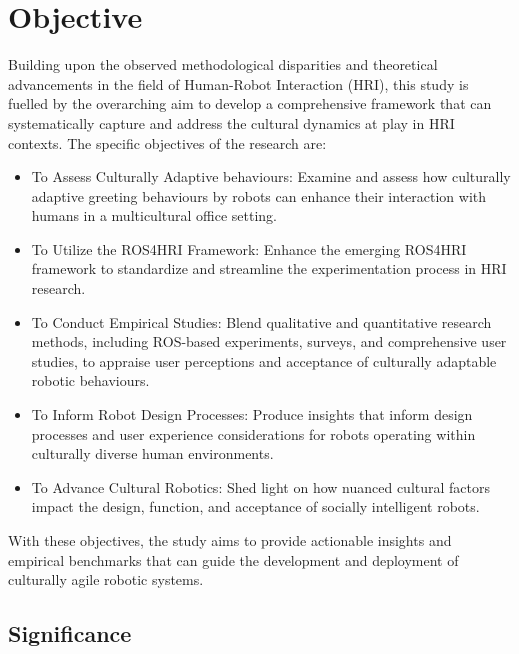 
\chapter{Objective}

Building upon the observed methodological disparities and theoretical advancements in the field of Human-Robot Interaction (HRI), this study is fuelled by the overarching aim to develop a comprehensive framework that can systematically capture and address the cultural dynamics at play in HRI contexts. The specific objectives of the research are:
\begin{itemize}
\item To Assess Culturally Adaptive behaviours: Examine and assess how culturally adaptive greeting behaviours by robots can enhance their interaction with humans in a multicultural office setting.
\item To Utilize the ROS4HRI Framework: Enhance the emerging ROS4HRI framework to standardize and streamline the experimentation process in HRI research.
\item To Conduct Empirical Studies: Blend qualitative and quantitative research methods, including ROS-based experiments, surveys, and comprehensive user studies, to appraise user perceptions and acceptance of culturally adaptable robotic behaviours.
\item To Inform Robot Design Processes: Produce insights that inform design processes and user experience considerations for robots operating within culturally diverse human environments.
\item To Advance Cultural Robotics: Shed light on how nuanced cultural factors impact the design, function, and acceptance of socially intelligent robots.
\end{itemize}
With these objectives, the study aims to provide actionable insights and empirical benchmarks that can guide the development and deployment of culturally agile robotic systems.

\section{Significance}

